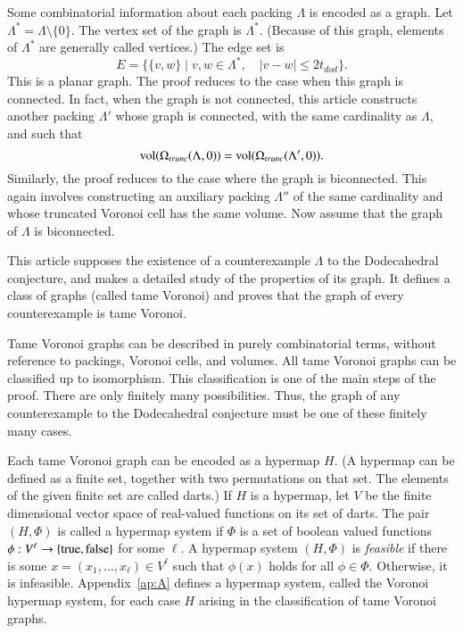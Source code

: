 \documentclass{article} %
\begin{document}
Some combinatorial information about each packing $\Lambda$ is encoded
as a  graph.  Let $\Lambda^* = \Lambda\setminus\{0\}$. 
The vertex set of the graph is $\Lambda^*$.
(Because of this graph,  elements of $\Lambda^*$ are generally called vertices.)
The edge set is 
$$
E = \{\{v,w\} \mid v,w\in\Lambda^*,\quad   |v-w| \le 2t_{dod}\}.
$$
This is a planar graph.  
The proof reduces to the case when this graph is connected.  In fact,
when the graph is not connected, this article constructs another packing
$\Lambda'$ whose graph is connected, with the same cardinality as $\Lambda$,
and such that
$$
{\operatorname{vol}}(\Omega_{trunc}(\Lambda,0)) = {\operatorname{vol}}(\Omega_{trunc}(\Lambda',0)). 
$$
Similarly, the proof reduces to the case where the graph is biconnected.
  This again involves constructing an auxiliary 
packing $\Lambda''$ of the same cardinality and whose  truncated Voronoi cell has the same volume.  Now assume that the graph of $\Lambda$ is 
biconnected.

This article supposes the existence of a counterexample $\Lambda$ to
the Dodecahedral conjecture, and makes a detailed study of the
properties of its graph. It defines a class of graphs (called tame
Voronoi) and proves that the graph of every counterexample is tame
Voronoi.

Tame Voronoi graphs can be described in purely combinatorial terms,
without reference to packings, Voronoi cells, and volumes. All tame
Voronoi graphs can be classified up to isomorphism. This
classification is one of the main steps of the proof. There are only
finitely many possibilities. Thus, the graph of any counterexample to
the Dodecahedral conjecture must be one of these finitely many cases.

Each tame Voronoi graph can be encoded as a hypermap $H$. (A hypermap
can be defined as a finite set, together with two permutations on that
set. The elements of the given finite set are called darts.) If $H$ is
a hypermap, let $V$ be the finite dimensional vector space of
real-valued functions on its set of darts. The pair $(H,\Phi)$ is
called a hypermap system if $\Phi$ is a set of boolean valued
functions $\phi:V^\ell \to \{{\operatorname{true}},{\operatorname{false}}\}$ for some $\ell$.
A hypermap system $(H,\Phi)$ is {\it feasible} if there is some
$x=(x_1,\ldots,x_\ell)\in V^\ell$ such that $\phi(x)$ holds for all
$\phi\in\Phi$. Otherwise, it is infeasible. Appendix~\ref{ap:A}
defines a hypermap system, called the Voronoi hypermap system, for
each case $H$ arising in the classification of tame Voronoi graphs.
\end{document}
